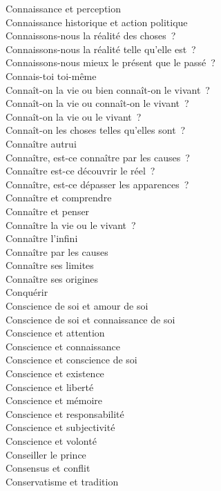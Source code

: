 \documentclass[a4paper,12pt]{article}
\begin{document}
Connaissance et perception \\
Connaissance historique et action politique \\
Connaissons-nous la réalité des choses ? \\
Connaissons-nous la réalité telle qu'elle est ? \\
Connaissons-nous mieux le présent que le passé ? \\
Connais-toi toi-même \\
Connaît-on la vie ou bien connaît-on le vivant ? \\
Connaît-on la vie ou connaît-on le vivant ? \\
Connaît-on la vie ou le vivant ? \\
Connaît-on les choses telles qu'elles sont ? \\
Connaître autrui \\
Connaître, est-ce connaître par les causes ? \\
Connaître est-ce découvrir le réel ? \\
Connaître, est-ce dépasser les apparences ? \\
Connaître et comprendre \\
Connaître et penser \\
Connaître la vie ou le vivant ? \\
Connaître l'infini \\
Connaître par les causes \\
Connaître ses limites \\
Connaître ses origines \\
Conquérir \\
Conscience de soi et amour de soi \\
Conscience de soi et connaissance de soi \\
Conscience et attention \\
Conscience et connaissance \\
Conscience et conscience de soi \\
Conscience et existence \\
Conscience et liberté \\
Conscience et mémoire \\
Conscience et responsabilité \\
Conscience et subjectivité \\
Conscience et volonté \\
Conseiller le prince \\
Consensus et conflit \\
Conservatisme et tradition \\
\end{document}

